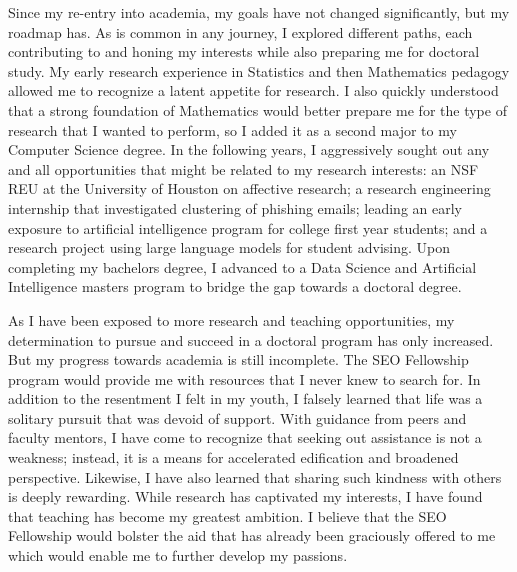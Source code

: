 \documentclass[12pt]{article}
\begin{document}
Since my re-entry into academia, my goals have not changed significantly, but my
roadmap has. As is common in any journey, I explored different paths, each
contributing to and honing my interests while also preparing me for doctoral
study.  My early research experience in Statistics and then Mathematics pedagogy
allowed me to recognize a latent appetite for research.  I also quickly understood
that a strong foundation of Mathematics would better prepare me for the type of
research that I wanted to perform, so I added it as a second major to my Computer
Science degree.  In the following years, I aggressively sought out any
and all opportunities that might be related to my research
interests: an NSF REU at the University of Houston on affective
research; a research engineering internship that investigated
clustering of phishing emails; leading an early exposure to artificial
intelligence program for college first year students; and a research project
using large language models for student advising.  Upon completing my bachelors
degree, I advanced to a Data Science and Artificial Intelligence
masters program to bridge the gap towards a doctoral degree.  

As I have been exposed to more research and teaching opportunities, my
determination to pursue and succeed in a doctoral program has only increased.
But my progress towards
academia is still incomplete. The SEO Fellowship program would provide me with
resources that I never knew to search for.  In addition to the resentment I felt
in my youth, I falsely learned that life was a solitary pursuit that was devoid
of support.  With guidance from peers and faculty mentors, I have come to
recognize that seeking out assistance is not a weakness; instead, it is a means
for accelerated edification and broadened perspective.  Likewise, I have also
learned that sharing such kindness with others is deeply rewarding. While research has
captivated my interests, I have found that teaching has become my greatest
ambition.  I believe that the SEO Fellowship would bolster the aid that
has already been graciously offered to me which would enable me to further
develop my passions.
\end{document}

